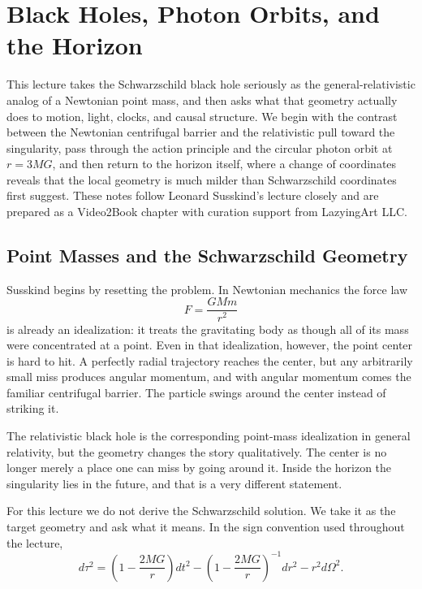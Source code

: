 \chapter{Black Holes, Photon Orbits, and the Horizon}

This lecture takes the Schwarzschild black hole seriously as the general-relativistic analog of a Newtonian point mass, and then asks what that geometry actually does to motion, light, clocks, and causal structure. We begin with the contrast between the Newtonian centrifugal barrier and the relativistic pull toward the singularity, pass through the action principle and the circular photon orbit at \(r=3MG\), and then return to the horizon itself, where a change of coordinates reveals that the local geometry is much milder than Schwarzschild coordinates first suggest. These notes follow Leonard Susskind's lecture closely and are prepared as a Video2Book chapter with curation support from LazyingArt LLC.

\section{Point Masses and the Schwarzschild Geometry}

Susskind begins by resetting the problem. In Newtonian mechanics the force law
\begin{equation}
F=\frac{GMm}{r^{2}}
\end{equation}
is already an idealization: it treats the gravitating body as though all of its mass were concentrated at a point. Even in that idealization, however, the point center is hard to hit. A perfectly radial trajectory reaches the center, but any arbitrarily small miss produces angular momentum, and with angular momentum comes the familiar centrifugal barrier. The particle swings around the center instead of striking it.

The relativistic black hole is the corresponding point-mass idealization in general relativity, but the geometry changes the story qualitatively. The center is no longer merely a place one can miss by going around it. Inside the horizon the singularity lies in the future, and that is a very different statement.

For this lecture we do not derive the Schwarzschild solution. We take it as the target geometry and ask what it means. In the sign convention used throughout the lecture,
\begin{equation}
d\tau^{2}
=
\left(1-\frac{2MG}{r}\right)dt^{2}
-
\left(1-\frac{2MG}{r}\right)^{-1}dr^{2}
-
r^{2}d\Omega^{2}.
\end{equation}

